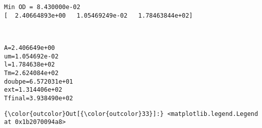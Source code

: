 \documentclass[11pt]{article}
\begin{document}
    \begin{Verbatim}[commandchars=\\\{\}]
Min OD = 8.430000e-02
[  2.40664893e+00   1.05469249e-02   1.78463844e+02]

    \end{Verbatim}

    \begin{center}
    \end{center}
    { \hspace*{\fill} \\}
    
    \begin{Verbatim}[commandchars=\\\{\}]
A=2.406649e+00
um=1.054692e-02
l=1.784638e+02
Tm=2.624084e+02
doubpe=6.572031e+01
ext=1.314406e+02
Tfinal=3.938490e+02

    \end{Verbatim}

            \begin{Verbatim}[commandchars=\\\{\}]
{\color{outcolor}Out[{\color{outcolor}33}]:} <matplotlib.legend.Legend at 0x1b2070094a8>
\end{Verbatim}
        
    \begin{center}
    \end{center}
    { \hspace*{\fill} \\}
    
    \begin{center}
    \end{center}
    { \hspace*{\fill} \\}
    
\end{document}
